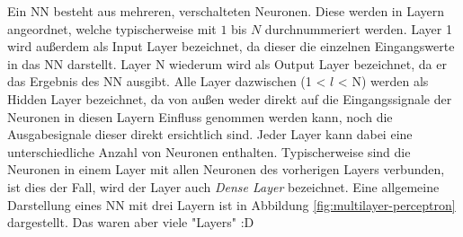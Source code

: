 Ein \ac{NN} besteht aus mehreren, verschalteten Neuronen. Diese werden in Layern angeordnet, welche typischerweise mit $1$ bis $N$ durchnummeriert werden. Layer 1 wird außerdem als Input Layer bezeichnet, da dieser die einzelnen Eingangswerte in das \ac{NN} darstellt. Layer N wiederum wird als Output Layer bezeichnet, da er das Ergebnis des \ac{NN} ausgibt. Alle Layer dazwischen (1 < $l$ < N) werden als Hidden Layer bezeichnet, da von außen weder direkt auf die Eingangssignale der Neuronen in diesen Layern Einfluss genommen werden kann, noch die Ausgabesignale dieser direkt ersichtlich sind. Jeder Layer kann dabei eine unterschiedliche Anzahl von Neuronen enthalten. Typischerweise sind die Neuronen in einem Layer mit allen Neuronen des vorherigen Layers verbunden, ist dies der Fall, wird der Layer auch \textit{Dense Layer} bezeichnet. Eine allgemeine Darstellung eines \ac{NN} mit drei Layern ist in Abbildung \ref{fig:multilayer-perceptron} dargestellt.
Das waren aber viele "Layers" :D

